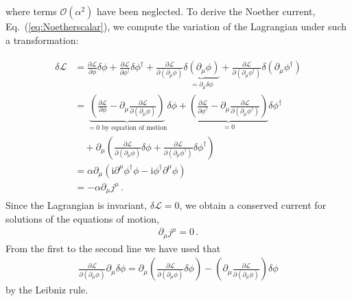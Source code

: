 \documentclass[12pt]{report}
\renewcommand{\L}{\ensuremath{\mathscr{L}}}
\renewcommand{\i}{\ensuremath{\text{i}}}
\newcommand{\2}{\ensuremath{\sqrt{2}\,}}
\renewcommand{\L}{\ensuremath{\mathscr{L}}}
\begin{document}
{      where terms $\mathcal{O}\left(\alpha^2\right)$ have been neglected.
      To derive the Noether current, Eq.~(\ref{eq:Noetherscalar}), we
      compute the variation of the Lagrangian under such a transformation:
      
      \begin{align}\label{eq:derivation}
        \begin{split}
          \delta\L &= \frac{\partial \L}{\partial \phi}\delta \phi + \frac{\partial \L}{\partial
            \phi^\dagger}\delta \phi^\dagger +\frac{\partial \L}{\partial \left(\partial_\mu
              \phi\right)} \underbrace{\delta \left(\partial_\mu \phi\right)}_{=\partial_\mu
            \delta\phi} +\frac{\partial \L}{\partial \left(\partial_\mu \phi^\dagger\right)
          }\delta  \left(\partial_\mu \phi^\dagger\right)\\ 
          &= \underbrace{\left(\frac{\partial \L}{\partial \phi}- \partial_\mu \frac{\partial \L}{\partial
                \left(\partial_\mu \phi\right)}\right)}_{=0\text{ by equation of motion}} \delta
          \phi + \underbrace{\left(\frac{\partial \L}{\partial \phi^\dagger}- \partial_\mu
              \frac{\partial \L}{\partial \left(\partial_\mu \phi^\dagger\right)}\right)}_{=0}
          \delta \phi^\dagger\\ 
          &\quad + \partial_\mu \left(
            \frac{\partial \L}{\partial \left(\partial_\mu \phi\right)} \delta\phi
            +\frac{\partial \L}{\partial \left(\partial_\mu \phi^\dagger\right)}
            \delta\phi^\dagger\right)\\
          &= \alpha \partial_\mu\left(\i \partial^\mu \phi^\dagger \phi -\i
            \phi^\dagger\partial^\mu \phi\right)\\
          &=-\alpha \partial_\mu j^\mu \,.
        \end{split}
      \end{align}
      Since the Lagrangian is invariant, $\delta\L = 0$, we obtain a conserved current for 
      solutions of the equations of motion,
      \begin{align}    
        \partial_\mu j^\mu =0\,.
      \end{align}  
      From the first to the second line we have used that
      \begin{align}
        \frac{\partial \L}{\partial \left(\partial_\mu \phi\right)} \partial_\mu \delta \phi =
        \partial_\mu\left(\frac{\partial \L}{\partial \left(\partial_\mu \phi\right)} \delta
          \phi\right)  - \left(\partial_\mu \frac{\partial \L}{\partial \left(\partial_\mu \phi\right)}\right)
        \delta \phi           
      \end{align}
      by the Leibniz rule. 

}
\end{document}
